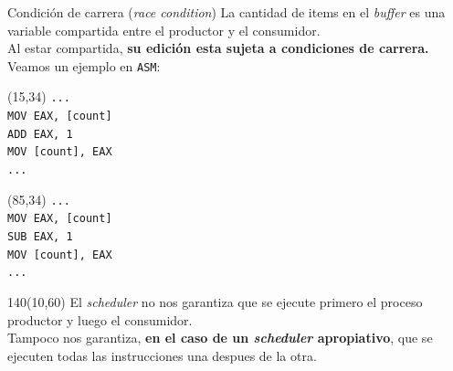 \documentclass[aspectratio=169]{beamer}
\begin{document}
\begin{frame}[fragile,t]{Condición de carrera (\emph{race condition})}
    La cantidad de items en el \emph{buffer} es una variable compartida entre el productor y el consumidor.\\
    \medskip
    Al estar compartida, \textcolor{verdeuca}{\textbf{su edición esta sujeta a condiciones de carrera.}}\\
    \medskip
    Veamos un ejemplo en \texttt{ASM}:\\
    \begin{textblock}{70}(15,34)
    \verb|...|\\
    \verb|MOV EAX, [count]|\\
    \verb|ADD EAX, 1      |\\
    \verb|MOV [count], EAX|\\
    \verb|...|\\
    \end{textblock}
    \begin{textblock}{70}(85,34)
    \verb|...|\\
    \verb|MOV EAX, [count]|\\
    \verb|SUB EAX, 1      |\\
    \verb|MOV [count], EAX|\\
    \verb|...|\\
    \end{textblock}
    \begin{textblock}{140}(10,60)
    \small
    \textcolor{rojo}{
    El \emph{scheduler} no nos garantiza que se ejecute primero el proceso productor y luego el consumidor.\\
    Tampoco nos garantiza, \textbf{en el caso de un \emph{scheduler} apropiativo}, que se ejecuten todas las instrucciones una despues de la otra.\\}
    \medskip
    \normalsize
    \pause
    \end{textblock}
\end{frame}
\end{document}
